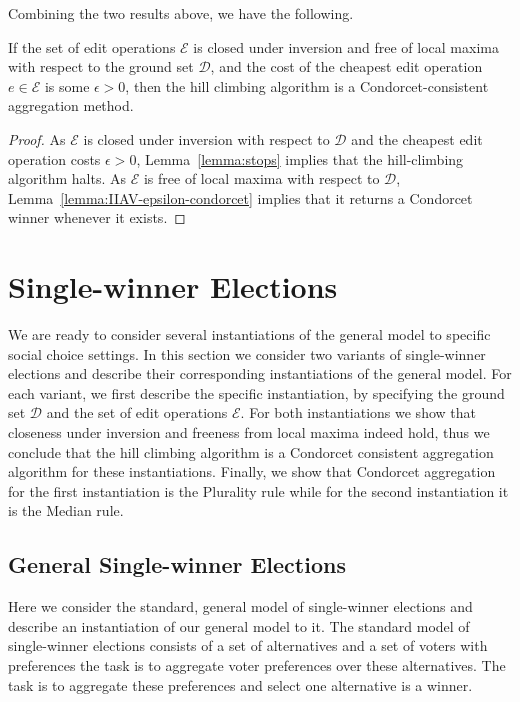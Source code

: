 \documentclass[sigconf]{aamas}  %
\newcommand{\calD}{\mathcal{D}}
\newcommand{\calE}{\mathcal{E}}
\begin{document}
Combining the two results above, we have the following.

\begin{corollary}\label{corollary:main}
If the set of edit operations $\calE$ is closed under inversion and free of local maxima with respect to the ground set $\calD$,
and the cost of the cheapest edit operation $e \in \calE$ is some $\epsilon > 0$,
then the hill climbing algorithm is a Condorcet-consistent aggregation method.
\end{corollary}

\begin{proof}
%
As $\calE$ is closed under inversion with respect to $\calD$ and the cheapest edit operation costs $\epsilon > 0$,
Lemma~\ref{lemma:stops} implies that the hill-climbing algorithm halts.
As $\calE$ is free of local maxima with respect to $\calD$,
Lemma~\ref{lemma:IIAV-epsilon-condorcet} implies that it returns a Condorcet winner whenever it exists.
%
\end{proof}


\section{Single-winner Elections}

We are ready to consider several instantiations of the general model to specific social choice settings.
In this section we consider two variants of single-winner elections and describe their corresponding instantiations of the general model.
For each variant,
we first describe the specific instantiation,
by specifying the ground set $\calD$ and the set of edit operations $\calE$.
For both instantiations we show that closeness under inversion and freeness from local maxima indeed hold,
thus we conclude that the hill climbing algorithm is a Condorcet consistent aggregation algorithm for these instantiations.
Finally, we show that Condorcet aggregation for the first instantiation is the Plurality rule while for the second instantiation it is the Median rule.


\subsection{General Single-winner Elections}

Here we consider the standard, general model of single-winner elections and describe an instantiation of our general model to it.
The standard model of single-winner elections consists of a set of alternatives and a set of voters with preferences the task is to aggregate voter preferences over these alternatives.
The task is to aggregate these preferences and select one alternative is a winner.
\end{document}
